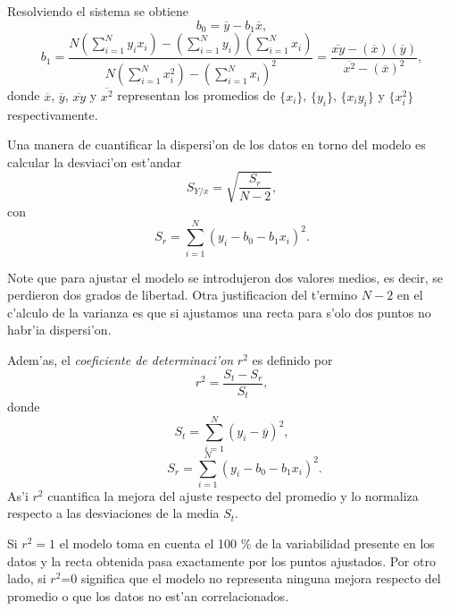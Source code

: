 \documentclass[a4paper]{report}
\begin{document}
Resolviendo el sistema se obtiene
\begin{equation}
b_0 = \overline{y}-b_1 \overline{x},
\end{equation}
\begin{equation}
b_1 =  \frac{N\left(\sum_{i=1}^N y_{i}x_{i}\right)-\left(\sum_{i=1}^N y_{i}\right)\left(\sum_{i=1}^N x_{i}\right) }{N\left(\sum_{i=1}^N x_{i}^{2}\right)- \left(\sum_{i=1}^N x_{i}\right)^{2}}=\frac{\overline{xy}-(\overline{x})(\overline{y})}{\overline{x^2}-(\overline{x})^2},
\end{equation}
donde $\overline{x}$, $\overline{y}$, $\overline{xy}$ y $\overline{x^2}$ representan los promedios de $\{x_i\}$, $\{ y_i\}$, $\{x_iy_i\}$ y $\{x_i^2\}$ respectivamente. 

Una manera de cuantificar la dispersi'on de los datos en torno del modelo es calcular la desviaci'on est'andar
\begin{equation}
S_{Y/x} = \sqrt{\dfrac{S_{r}}{N-2}},
\end{equation}
con 
\begin{equation}
S_{r}= \sum_{i=1}^N (y_{i} - b_0 - b_1 x_{i})^{2}.
\end{equation}

Note que para ajustar el modelo se introdujeron dos valores medios, es decir, se perdieron dos grados de libertad. Otra justificacion del t'ermino $N-2$ en el c'alculo de la varianza es que si ajustamos una recta para s'olo dos puntos no habr'ia dispersi'on.


Adem'as, el \textit{coeficiente de determinaci'on} $r^2$ es definido por
\begin{equation}\label{r2}
r^{2} = \dfrac{S_{t} - S_{r}}{S_{t}},
\end{equation}
donde 
\begin{equation}\label{St}
S_t = \sum_{i=1}^N\left(y_i-\overline{y}\right)^2, 
\end{equation}
\begin{equation}
\qquad S_{r}= \sum_{i=1}^N (y_{i} - b_0 - b_1 x_{i})^{2}.
\end{equation}
As'i $r^{2}$ cuantifica la mejora del ajuste respecto del promedio y lo normaliza respecto a las desviaciones de la media $S_t$.

Si $r^{2}=1$ el modelo toma en cuenta el 100 \% de la variabilidad presente en los datos y la recta obtenida pasa exactamente por los puntos ajustados. Por otro lado,  si $r^{2}$=0 significa que el modelo no representa ninguna mejora respecto del promedio o que los datos no est'an correlacionados.
\end{document}
